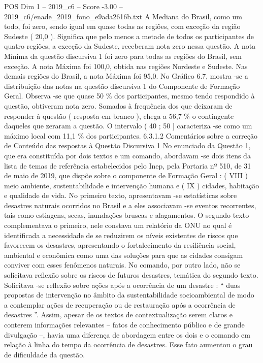 \begin{textsample}{POS Dim 1 – 2019\_c6 – Score -3.00 – 2019\_c6/enade\_2019\_fono\_e9ada2616b.txt}
A Mediana do Brasil, como um todo, foi zero, sendo igual em quase todas as regiões, com exceção da região Sudeste ( 20,0 ).
Significa que pelo menos a metade de todos os participantes de quatro regiões, a exceção da Sudeste, receberam nota zero nessa questão.
A nota Mínima da questão discursiva 1 foi zero para todas as regiões do Brasil, sem exceção.
A nota Máxima foi 100,0, obtida nas regiões Nordeste e Sudeste.
Nas demais regiões do Brasil, a nota Máxima foi 95,0.
No Gráfico 6.7, mostra -se a distribuição das notas na questão discursiva 1 do Componente de Formação Geral.
Observa -se que quase 50 \% dos participantes, mesmo tendo respondido à questão, obtiveram nota zero.
Somados à frequência dos que deixaram de responder à questão ( resposta em branco ), chega a 56,7 \% o contingente daqueles que zeraram a questão.
O intervalo ( 40 ; 50 ] caracteriza -se como um máximo local com 11,1 \% dos participantes. 6.3.1.2 Comentários sobre a correção de Conteúdo das respostas à Questão Discursiva 1 No enunciado da Questão 1, que era constituída por dois textos e um comando, abordavam -se dois itens da lista de temas de referência estabelecidos pelo Inep, pela Portaria nº 510, de 31 de maio de 2019, que dispõe sobre o componente de Formação Geral : ( VIII ) meio ambiente, sustentabilidade e intervenção humana e ( IX ) cidades, habitação e qualidade de vida.
No primeiro texto, apresentavam -se estatísticas sobre desastres naturais ocorridos no Brasil e a eles associavam -se eventos recorrentes, tais como estiagens, secas, inundações bruscas e alagamentos.
O segundo texto complementava o primeiro, nele constava um relatório da ONU no qual é identificada a necessidade de se reduzirem os níveis existentes de riscos que favorecem os desastres, apresentando o fortalecimento da resiliência social, ambiental e econômica como uma das soluções para que as cidades consigam conviver com esses fenômenos naturais.
No comando, por outro lado, não se solicitava reflexão sobre os riscos de futuros desastres, temática do segundo texto.
Solicitava -se reflexão sobre ações após a ocorrência de um desastre : “ duas propostas de intervenção no âmbito da sustentabilidade socioambiental de modo a contemplar ações de recuperação ou de restauração após a ocorrência de desastres ”.
Assim, apesar de os textos de contextualização serem claros e conterem informações relevantes – fatos de conhecimento público e de grande divulgação –, havia uma diferença de abordagem entre os dois e o comando em relação à linha do tempo da ocorrência de desastres.
Esse fato aumentou o grau de dificuldade da questão.

\end{textsample}
